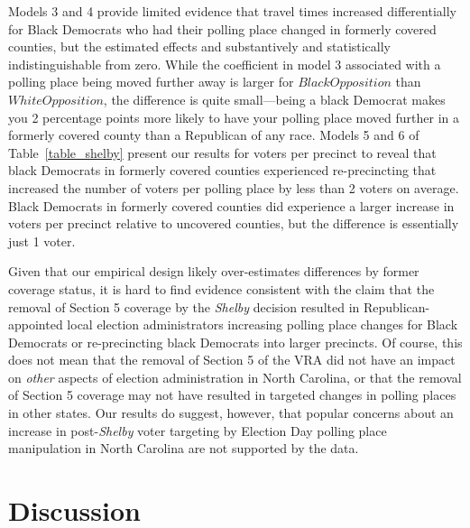 \documentclass[12pt]{article}
\begin{document}
Models 3 and 4 provide limited evidence that travel times increased differentially for Black Democrats who had their polling place changed in formerly covered counties, but the estimated effects and substantively and statistically indistinguishable from zero.  While the coefficient in model 3 associated with a polling place being moved further away is larger for $BlackOpposition$ than $WhiteOpposition$, the difference is quite small---being a black Democrat makes you 2 percentage points more likely to have your polling place moved further in a formerly covered county than a Republican of any race.  Models 5 and 6 of Table~\ref{table_shelby} present our results for voters per precinct to reveal that black Democrats in formerly covered counties experienced re-precincting that increased the number of voters per polling place by less than 2 voters on average.   Black Democrats in formerly covered counties did experience a larger increase in voters per precinct relative to uncovered counties, but the difference is essentially just 1 voter.

Given that our empirical design likely over-estimates differences by former coverage status, it is hard to find evidence consistent with the claim that the removal of Section 5 coverage by the \emph{Shelby} decision resulted in Republican-appointed local election administrators increasing polling place changes for Black Democrats or re-precincting black Democrats into larger precincts. Of course, this does not mean that the removal of Section 5 of the VRA did not have an impact on \emph{other} aspects of election administration in North Carolina, or that the removal of Section 5 coverage may not have resulted in targeted changes in polling places in other states. Our results do suggest, however, that popular concerns about an increase in post-\emph{Shelby} voter targeting by Election Day polling place manipulation in North Carolina are not supported by the data. %



\section{\large Discussion}\label{section_discussion}
\vspace*{-0.5cm}
\end{document}
